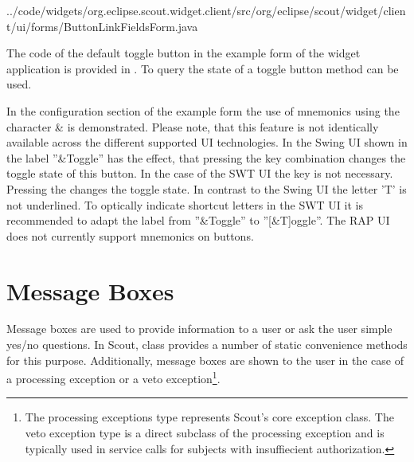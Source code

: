 \documentclass[a4paper,10pt,twoside]{book}
\begin{document}
{
{../code/widgets/org.eclipse.scout.widget.client/src/org/eclipse/scout/widget/client/ui/forms/ButtonLinkFieldsForm.java}

The code of the default toggle button in the example form of the widget application is provided in . 
To query the state of a toggle button method  can be used. 

In the configuration section of the example form the use of mnemonics using the character \& is demonstrated. 
Please note, that this feature is not identically available across the different supported UI technologies. 
In the Swing UI shown in  the label ''\&Toggle'' has the effect, that pressing the  key combination changes the toggle state of this button. 
In the case of the SWT UI the  key is not necessary. 
Pressing the  changes the toggle state. 
In contrast to the Swing UI the letter 'T' is not underlined. 
To optically indicate shortcut letters in the SWT UI it is recommended to adapt the label from ''\&Toggle'' to ''[\&T]oggle''. 
The RAP UI does not currently support mnemonics on buttons. 

\section{Message Boxes}

Message boxes are used to provide information to a user or ask the user simple yes/no questions. 
In Scout, class  provides a number of static convenience methods for this purpose. 
Additionally, message boxes are shown to the user in the case of a processing exception or a veto exception\footnote{
The processing exceptions type  represents Scout's core exception class. 
The veto exception type  is a direct subclass of the processing exception and is typically used in service calls for subjects with insuffiecient authorization. 
}. 

}
\end{document}
